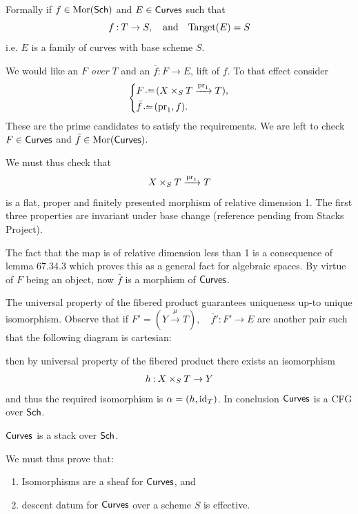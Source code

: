 \documentclass[12pt]{memoir}
\begin{document}
\begin{ptcbp}
Formally if \(f\in\operatorname{Mor}(\mathsf{Sch})\) and \(E\in\mathsf{Curves}\) such that 
\[
f\mathbin{:}T\to S,\quad\text{and}\quad\text{Target}(E)=S
\]
i.e. \(E\) is a family of curves with base scheme \(S\).\par

We would like an \(F\) \emph{over} \(T\) and an \(\bar{f}:F\to E\), lift of \(f\). To that effect consider 
\[
\left\lbrace
\begin{aligned}
    &F\defeq (X\times_ST\xrightarrow{\pr_1}T),\\
    &\bar{f}\defeq(\pr_1,f).
\end{aligned}
\right.
\]
These are the prime candidates to satisfy the requirements. We are left to check \(F\in\mathsf{Curves}\) and \(\bar{f}\in\operatorname{Mor}(\mathsf{Curves})\).\par
We must thus check that 
\[
X\times_ST\xrightarrow{\operatorname{pr}_1}T
\]
is a flat, proper and finitely presented morphism of relative dimension 1. The first three properties are invariant under base change (reference pending from Stacks Project).\par
The fact that the map is of relative dimension less than 1 is a consequence of lemma 67.34.3 which proves this as a general fact for algebraic spaces. By virtue of \(F\) being an object, now \(\bar{f}\) is a morphism of \(\mathsf{Curves}\).\par
The universal property of the fibered product guarantees uniqueness up-to unique isomorphism. Observe that if \(F'=(Y\xrightarrow{\mu}T),\quad \bar{f}':F'\to E\) are another pair such that the following diagram is cartesian:
\begin{center}
        \end{center}
then by universal property of the fibered product there exists an isomorphism
\[
h\mathbin{:} X\times_ST\to Y
\]
and thus the required isomorphism is \(\alpha=(h,\operatorname{id}_T)\). In conclusion \(\mathsf{Curves}\) is a CFG over \(\mathsf{Sch}\).
\end{ptcbp}

\begin{Th}
    \(\mathsf{Curves}\) is a stack over \(\mathsf{Sch}\).
\end{Th}

We must thus prove that:
\begin{enumerate}
    \item Isomorphisms are a sheaf for \(\mathsf{Curves}\), and
    \item descent datum for \(\mathsf{Curves}\) over a scheme \(S\) is effective.
\end{enumerate}
\end{document}
